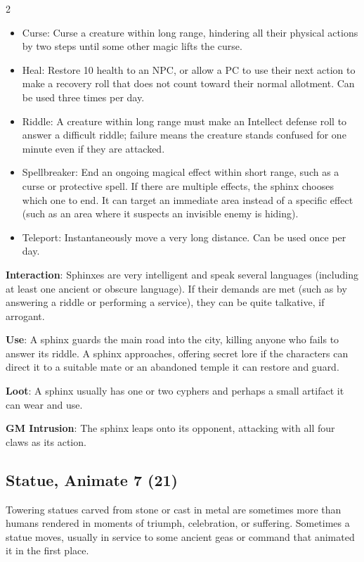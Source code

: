 \begin{multicols}{2}
\begin{itemize}
\item Curse: Curse a creature within long range, hindering all their physical actions by two steps until some other magic lifts the curse. 
\item Heal: Restore 10 health to an NPC, or allow a PC to use their next action to make a recovery roll that does not count toward their normal allotment. Can be used three times per day. 
\item Riddle: A creature within long range must make an Intellect defense roll to answer a difficult riddle; failure means the creature stands confused for one minute even if they are attacked. 
\item Spellbreaker: End an ongoing magical effect within short range, such as a curse or protective spell. If there are multiple effects, the sphinx chooses which one to end. It can target an immediate area instead of a specific effect (such as an area where it suspects an invisible enemy is hiding). 
\item Teleport: Instantaneously move a very long distance. Can be used once per day. 
\end{itemize}

\textbf{Interaction}: Sphinxes are very intelligent and speak several languages (including at least one ancient or obscure language). If their demands are met (such as by answering a riddle or performing a service), they can be quite talkative, if arrogant. 

\textbf{Use}: A sphinx guards the main road into the city, killing anyone who fails to answer its riddle. A sphinx approaches, offering secret lore if the characters can direct it to a suitable mate or an abandoned temple it can restore and guard. 

\textbf{Loot}: A sphinx usually has one or two cyphers and perhaps a small artifact it can wear and use.

\textbf{GM Intrusion}: The sphinx leaps onto its opponent, attacking with all four claws as its action.

\subsection{Statue, Animate	7 (21)}

Towering statues carved from stone or cast in metal are sometimes more than humans rendered in moments of triumph, celebration, or suffering. Sometimes a statue moves, usually in service to some ancient geas or command that animated it in the first place.


\end{multicols}
